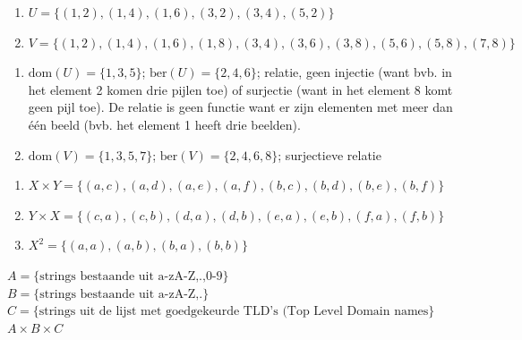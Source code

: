 \begin{Oplossing}{2.1}
\begin{enumerate}
\item $U=\{(1,2),(1,4),(1,6),(3,2),(3,4),(5,2) \}$
\item $V=\{(1,2),(1,4),(1,6),(1,8),(3,4),(3,6),(3,8),(5,6),(5,8),(7,8) \}$
\end{enumerate}
\end{Oplossing}
\begin{Oplossing}{2.2}
\begin{enumerate}
\item $\text{dom}(U)=\{1,3,5 \}$; $\text{ber}(U)=\{2,4,6 \}$; relatie, geen injectie (want bvb. in het element 2 komen drie pijlen toe) of surjectie (want in het element 8 komt geen pijl toe). De relatie is geen functie want er zijn elementen met meer dan één beeld (bvb. het element 1 heeft drie beelden).
\item $\text{dom}(V)=\{1,3,5,7 \}$; $\text{ber}(V)=\{2,4,6,8 \}$; surjectieve relatie
\end{enumerate}
\end{Oplossing}
\begin{Oplossing}{2.3}
\begin{enumerate}
\item $X\times Y=\{(a,c),(a,d),(a,e),(a,f),(b,c),(b,d),(b,e),(b,f) \}$
\item $Y\times X=\{(c,a),(c,b),(d,a),(d,b),(e,a),(e,b),(f,a),(f,b) \}$
\item $X^2=\{(a,a),(a,b),(b,a),(b,b) \}$
\end{enumerate}
\end{Oplossing}
\begin{Oplossing}{2.4}
$A=\{\text{strings bestaande uit a-zA-Z,.,0-9} \}$\\
$B=\{\text{strings bestaande uit a-zA-Z,.} \}$\\
$C=\{ \text{strings uit de lijst met goedgekeurde TLD's (Top Level Domain names}\}$\\
$A\times B\times C$
\end{Oplossing}
